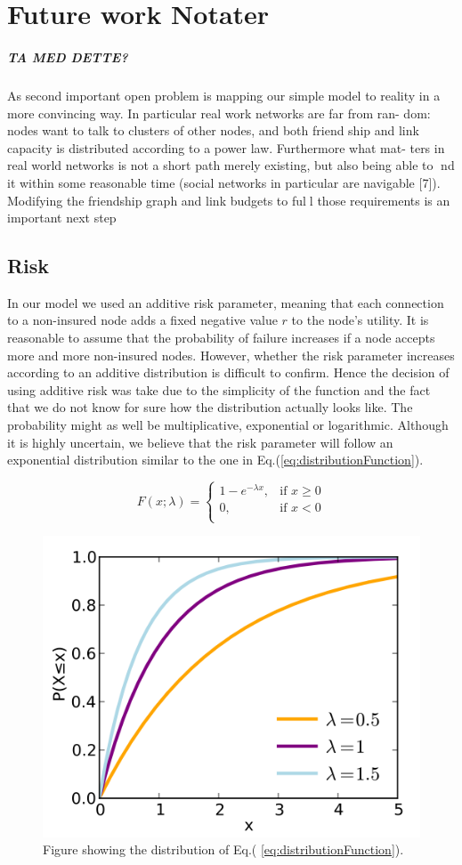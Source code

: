 \section{Future work Notater}
\label{chp:futurework} 
\subparagraph{TA MED DETTE?}
As second important open problem is mapping our simple model to reality
in a more convincing way. In particular real work networks are far from ran-
dom: nodes want to talk to clusters of other nodes, and both friend ship and
link capacity is distributed according to a power law. Furthermore what mat-
ters in real world networks is not a short path merely existing, but also being
able to nd it within some reasonable time (social networks in particular are
navigable [7]). Modifying the friendship graph and link budgets to full those
requirements is an important next step
\subsection{Risk}
In our model we used an additive risk parameter, meaning that each connection to a non-insured node adds a fixed negative value $r$ to the node's utility. It is reasonable to assume that the probability of failure increases if a node accepts more and more non-insured nodes. However, whether the risk parameter increases according to an additive distribution is difficult to confirm. Hence the decision of using additive risk was take due to the simplicity of the function and the fact that we do not know for sure how the distribution actually looks like. The probability might as well be multiplicative, exponential or logarithmic. Although it is highly uncertain, we believe that the risk parameter will follow an exponential distribution similar to the one in Eq.(\ref{eq:distributionFunction}).

\begin{equation}
    F(x;\lambda)= 
\begin{cases}
    1-e^{-\lambda x} ,& \text{if } x \geq 0\\
   0,& \text{if }  x<0\\
    
    
\end{cases}
\label{eq:distributionFunction}
\end{equation}



\begin{figure}[h]
\centering
  \includegraphics[width=0.5\linewidth]{../Figures/exponentialFunction.png}
  \caption{\label{fig:exponentialFunction} Figure showing the distribution of Eq.( \ref{eq:distributionFunction}). }
\end{figure}

